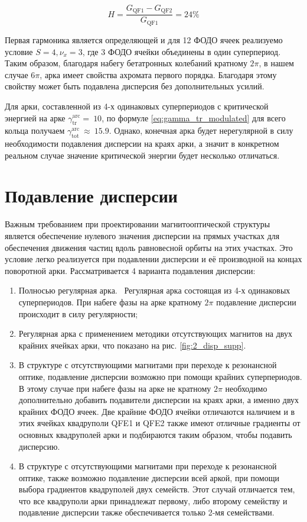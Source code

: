 \begin{equation}
H=\frac{G_{\textrm{QF1}}-G_{\textrm{QF2}}}{G_{\textrm{QF1}}}=24\%
\label {eq:modulated_coeff}
\end{equation}

\noindent Первая гармоника является определяющей и для 12 ФОДО ячеек реализуемо условие $S=4, \nu_x=3$, где 3 ФОДО ячейки объединены в один суперпериод. Таким образом, благодаря набегу бетатронных колебаний кратному $2\pi$, в нашем случае $6\pi$, арка имеет свойства ахромата первого порядка. Благодаря этому свойству может быть подавлена дисперсия без дополнительных усилий.

\noindent Для арки, составленной из 4-х одинаковых суперпериодов с критической энергией  на арке $\gamma_{\text{tr}}^{\text{arc}}=\ 10$, по формуле \ref{eq:gamma_tr_modulated} для всего кольца получаем $\gamma_{\text{tot}}^{\text{arc}}\ \approx\ 15.9$. Однако, конечная арка будет нерегулярной в силу необходимости подавления дисперсии на краях арки, а значит в конкретном реальном случае значение критической энергии будет несколько отличаться.

\section{Подавление дисперсии}\label{sec:transition_variation/disp_supperssion}

\par Важным требованием при проектировании магнитооптической структуры является обеспечение нулевого значения дисперсии на прямых участках для обеспечения движения частиц вдоль равновесной орбиты на этих участках. Это условие легко реализуется при подавлении дисперсии и её производной на концах поворотной арки. Рассматривается 4 варианта подавления дисперсии:

\begin{enumerate} 
\item	Полносью регулярная арка. \ Регулярная арка состоящая из 4-х одинаковых суперпериодов. При набеге фазы на арке кратному $2\pi$ подавление дисперсии происходит в силу регулярности;
\item Регулярная арка с применением методики отсутствующих магнитов на двух крайних ячейках арки, что показано на рис. \ref{fig:2_disp_supp}.
\item В структуре с отсутствующими магнитами при переходе к резонансной оптике, подавление дисперсии возможно при помощи крайних суперпериодов. В этому случае при набеге фазы на арке не кратному $2\pi$ необходимо дополнительно добавить подавители дисперсии на краях арки, а именно двух крайних ФОДО ячеек. Две крайние ФОДО ячейки отличаются наличием и в этих ячейках квадруполи QFE1 и QFE2 также имеют отличные градиенты от основных квадруполей арки и подбираются таким образом, чтобы подавить дисперсию.
\item В структуре с отсутствующими магнитами при переходе к резонансной оптике, также возможно подавление дисперсии всей аркой, при помощи выбора градиентов квадруполей двух семейств. Этот случай отличается тем, что все квадруполи арки принадлежат первому, либо второму семейству и подавление дисперсии также обеспечивается только 2-мя семействами.
\end{enumerate} 

